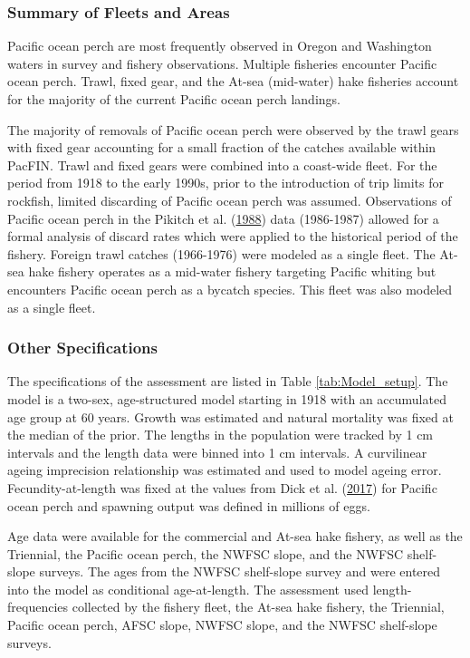 \documentclass[12pt,]{article}
\begin{document}
\subsubsection{Summary of Fleets and
Areas}\label{summary-of-fleets-and-areas}

Pacific ocean perch are most frequently observed in Oregon and
Washington waters in survey and fishery observations. Multiple fisheries
encounter Pacific ocean perch. Trawl, fixed gear, and the At-sea
(mid-water) hake fisheries account for the majority of the current
Pacific ocean perch landings.

The majority of removals of Pacific ocean perch were observed by the
trawl gears with fixed gear accounting for a small fraction of the
catches available within PacFIN. Trawl and fixed gears were combined
into a coast-wide fleet. For the period from 1918 to the early 1990s,
prior to the introduction of trip limits for rockfish, limited
discarding of Pacific ocean perch was assumed. Observations of Pacific
ocean perch in the Pikitch et al.
(\protect\hyperlink{ref-pikitch_evaluation_1988}{1988}) data (1986-1987)
allowed for a formal analysis of discard rates which were applied to the
historical period of the fishery. Foreign trawl catches (1966-1976) were
modeled as a single fleet. The At-sea hake fishery operates as a
mid-water fishery targeting Pacific whiting but encounters Pacific ocean
perch as a bycatch species. This fleet was also modeled as a single
fleet.

\subsubsection{Other Specifications}\label{other-specifications}

The specifications of the assessment are listed in Table
\ref{tab:Model_setup}. The model is a two-sex, age-structured model
starting in 1918 with an accumulated age group at 60 years. Growth was
estimated and natural mortality was fixed at the median of the prior.
The lengths in the population were tracked by 1 cm intervals and the
length data were binned into 1 cm intervals. A curvilinear ageing
imprecision relationship was estimated and used to model ageing error.
Fecundity-at-length was fixed at the values from Dick et al.
(\protect\hyperlink{ref-dick_meta-analysis_2017}{2017}) for Pacific
ocean perch and spawning output was defined in millions of eggs.

Age data were available for the commercial and At-sea hake fishery, as
well as the Triennial, the Pacific ocean perch, the NWFSC slope, and the
NWFSC shelf-slope surveys. The ages from the NWFSC shelf-slope survey
and were entered into the model as conditional age-at-length. The
assessment used length-frequencies collected by the fishery fleet, the
At-sea hake fishery, the Triennial, Pacific ocean perch, AFSC slope,
NWFSC slope, and the NWFSC shelf-slope surveys.
\end{document}
